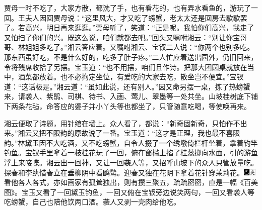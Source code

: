 贾母一时不吃了，大家方散，都洗了手，也有看花的，也有弄水看鱼的，游玩了一回。王夫人因回贾母说：``这里风大，才又吃了螃蟹，老太太还是回房去歇歇罢了。若高兴，明日再来逛逛。''贾母听了，笑道：``正是呢。我怕你们高兴，我走了又怕扫了你们的兴。既这么说，咱们就都去吧。''回头又嘱咐湘云：``别让你宝哥哥、林姐姐多吃了。''湘云答应着。又嘱咐湘云、宝钗二人说：``你两个也别多吃。那东西虽好吃，不是什么好的，吃多了肚子疼。''二人忙应着送出园外，仍旧回来，令将残席收拾了另摆。宝玉道：``也不用摆，咱们且作诗。把那大团圆桌就放在当中，酒菜都放着。也不必拘定坐位，有爱吃的大家去吃，散坐岂不便宜。''宝钗道：``这话极是。''湘云道：``虽如此说，还有别人。''因又命另摆一桌，拣了热螃蟹来，请袭人、紫鹃、司棋、待书、入画、莺儿、翠墨等一处共坐。山坡桂树底下铺下两条花毡，命答应的婆子并小丫头等也都坐了，只管随意吃喝，等使唤再来。

湘云便取了诗题，用针绾在墙上。众人看了，都说：``新奇固新奇，只怕作不出来。''湘云又把不限韵的原故说了一番。宝玉道：``这才是正理，我也最不喜限韵。''林黛玉因不大吃酒，又不吃螃蟹，自令人掇了一个绣墩倚栏杆坐着，拿着钓竿钓鱼。宝钗手里拿着一枝桂花玩了一回，俯在窗槛上掐了桂蕊掷向水面，引的游鱼浮上来唼喋。湘云出一回神，又让一回袭人等，又招呼山坡下的众人只管放量吃。探春和李纨惜春立在垂柳阴中看鸥鹭。迎春又独在花阴下拿着花针穿茉莉花。{\includegraphics[width=3mm]{../Images/00003}\includegraphics[width=3mm]{../Images/00012}\footnotesize \kaishu 看他各人各式，亦如画家有孤耸独出，则有攒三聚五，疏疏密密，直是一幅《百美图》。}宝玉又看了一回黛玉钓鱼，一回又俯在宝钗旁边说笑两句，一回又看袭人等吃螃蟹，自己也陪他饮两口酒。袭人又剥一壳肉给他吃。

